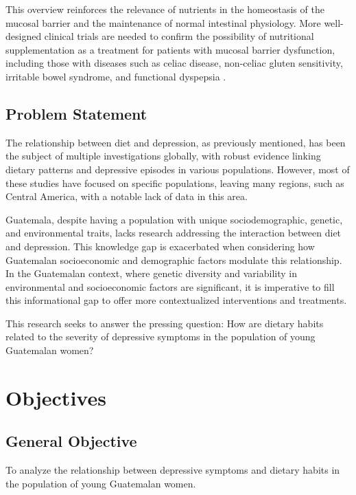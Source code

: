 \documentclass[jou]{apa7}
\begin{document}
This overview reinforces the relevance of nutrients in the homeostasis of the mucosal barrier and the maintenance of normal intestinal physiology. More well-designed clinical trials are needed to confirm the possibility of nutritional supplementation as a treatment for patients with mucosal barrier dysfunction, including those with diseases such as celiac disease, non-celiac gluten sensitivity, irritable bowel syndrome, and functional dyspepsia \parencite{Farre2020}.

\subsection{Problem Statement}

The relationship between diet and depression, as previously mentioned, has been the subject of multiple investigations globally, with robust evidence linking dietary patterns and depressive episodes in various populations. However, most of these studies have focused on specific populations, leaving many regions, such as Central America, with a notable lack of data in this area.

Guatemala, despite having a population with unique sociodemographic, genetic, and environmental traits, lacks research addressing the interaction between diet and depression. This knowledge gap is exacerbated when considering how Guatemalan socioeconomic and demographic factors modulate this relationship. In the Guatemalan context, where genetic diversity and variability in environmental and socioeconomic factors are significant, it is imperative to fill this informational gap to offer more contextualized interventions and treatments.

This research seeks to answer the pressing question: How are dietary habits related to the severity of depressive symptoms in the population of young Guatemalan women?


\section{Objectives}\label{objetivos}

\subsection{General Objective}\label{objetivo-general}

To analyze the relationship between depressive symptoms and dietary habits in the population of young Guatemalan women.
\end{document}
